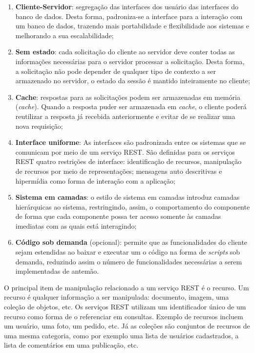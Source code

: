 \begin{enumerate}
	\item \textbf{Cliente-Servidor}:  segregação das interfaces dos usuário das interfaces do banco de dados. Desta forma, padroniza-se a interface para a interação com um banco de dados, trazendo mais portabilidade e flexibilidade aos sistemas e melhorando a sua escalabilidade;

	\item \textbf{Sem estado}: cada solicitação do cliente ao servidor deve conter todas as informações necessárias para o servidor processar a solicitação. Desta forma, a solicitação não pode depender de qualquer tipo de contexto a ser armazenado no servidor, o estado da sessão é mantido inteiramente no cliente;

	\item \textbf{Cache}: respostas para as solicitações podem ser armazenadas em memória (\textit{cache}). Quando a resposta puder ser armazenada em \textit{cache}, o cliente poderá reutilizar a resposta já recebida anteriormente e evitar de se realizar uma nova requisição;

	\item \textbf{Interface uniforme}: As interfaces são padronizada entre os sistemas que se comunicam por meio de um serviço REST. São definidas para os serviços REST quatro restrições de interface: identificação de recursos, manipulação de recursos por meio de representações; mensagens auto descritivas e hipermídia como forma de interação com a aplicação;

	\item \textbf{Sistema em camadas}: o estilo de sistema em camadas introduz camadas hierárquicas ao sistema, restringindo, assim, o comportamento do componente de forma que cada componente possa ter acesso somente às camadas imediatas com as quais está interagindo;

	\item \textbf{Código sob demanda} (opcional): permite que as funcionalidades do cliente sejam estendidas ao baixar e executar um o código na forma de \textit{scripts} sob demanda, reduzindo assim o número de funcionalidades necessárias a serem implementadas de antemão.
\end{enumerate}

O principal item de manipulação relacionado a um serviço REST é o recurso. Um recurso é qualquer informação a ser manipulada: documento, imagem, uma coleção de objetos, etc. Os serviços REST utilizam um identificador único de um recurso como forma de o referenciar em consultas. Exemplo de recursos incluem um usuário, uma foto, um pedido, etc. Já as coleções são conjuntos de recursos de uma mesma categoria, como por exemplo uma  lista de usuários cadastrados, a lista de comentários em uma publicação, etc.

